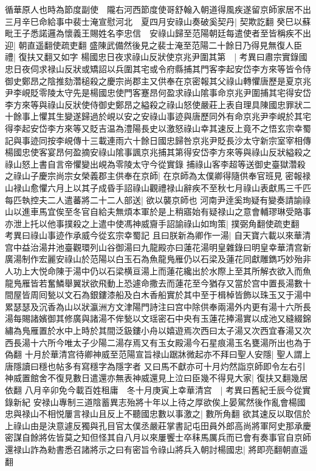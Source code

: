 循華原人也時為節度副使　隴右河西節度使哥舒翰入朝道得風疾遂留京師家居不出　三月辛巳命給事中裴士淹宣慰河北　夏四月安祿山奏破奚契丹|{
	契欺訖翻}
癸巳以蘇毗王子悉諾邏為懷義王賜姓名李忠信　安祿山歸至范陽朝廷每遣使者至皆稱疾不出迎|{
	朝直遥翻使疏吏翻}
盛陳武備然後見之裴士淹至范陽二十餘日乃得見無復人臣禮|{
	復扶又翻又如字}
楊國忠日夜求祿山反狀使京兆尹圍其第　|{
	考異曰肅宗實錄國忠日夜伺求禄山反狀或矯詔以兵圍其宅或令府縣捕其門客李起安岱李方來等皆令侍御史鄭昂之陰推劾濳槌殺之慶宗尚郡主又供奉在京密報其父祿山轉懼唐歷是夏京兆尹李峴貶零陵太守先是楊國忠使門客蹇昂何盈求祿山隂事命京兆尹圍捕其宅得安岱李方來等與祿山反狀使侍御史鄭昂之縊殺之祿山怒使嚴莊上表自理具陳國忠罪狀二十餘事上懼其生變遂歸過於峴以安之安祿山事迹與唐歷同外有命京兆尹李峴於其宅得李起安岱李方來等又貶吉温為澧陽長史以激怒祿山幸其速反上竟不之悟玄宗幸蜀記與事迹同按李峴傳十三載連雨六十餘日國忠歸咎京兆尹貶長沙太守新宗室宰相傳楊國忠使客宴昂何盈摘安祿山隂事諷京兆捕其第得安岱李方來等與祿山反狀縊殺之祿山怒上書自言帝懼變出峴為零陵太守今從實錄}
捕祿山客李超等送御史臺獄濳殺之祿山子慶宗尚宗女榮義郡主供奉在京師|{
	在京師為太僕卿得隨供奉官班見}
密報禄山禄山愈懼六月上以其子成昏手詔祿山觀禮禄山辭疾不至秋七月祿山表獻馬三千匹每匹執控夫二人遣蕃將二十二人部送|{
	欲以襲京師也}
河南尹逹奚珣疑有變奏請諭祿山以進車馬宜俟至冬官自給夫無煩本軍於是上稍寤始有疑禄山之意會輔璆琳受賂事亦泄上托以他事撲殺之上遣中使馮神威齎手詔諭祿山如珣策|{
	撲弼角翻使疏吏翻　考異曰祿山事迹作承威今從玄宗幸蜀記}
且曰朕新為卿作一湯|{
	自天寶六載以來華清宫中益治湯井池臺觀環列山谷御湯曰九龍殿亦曰蓮花湯明皇雜錄曰明皇幸華清宫新廣湯制作宏麗安祿山於范陽以白玉石為魚龍鳬雁仍以石梁及蓮花同獻雕鐫巧妙殆非人功上大悦命陳于湯中仍以石梁横亘湯上而蓮花纔出於水際上至其所解衣欲入而魚龍鳬雁皆若奮鱗舉翼狀欲飛動上恐遽命撒去而蓮花至今猶存又當於宫中置長湯數十間屋皆周囘甃以文石為銀鏤漆船及白木香船實於其中至于楫棹皆飾以珠玉又于湯中累瑟瑟及沉香為山以狀瀛洲方文津陽門詩注曰宫中除供奉兩湯外内更有湯十六所長湯每賜諸嬪御其修廣與諸湯不侔甃以文瑶密石中央有玉蓮花捧湯實以成池又縫綴錦繡為鳬雁置於水中上時於其間泛鈒鏤小舟以嬉遊焉次西曰太子湯又次西宜春湯又次西長湯十六所今唯太子少陽二湯存焉又有玉女殿湯今石星痕湯玉名甕湯所出也為于偽翻}
十月於華清宫待卿神威至范陽宣旨禄山踞牀微起亦不拜曰聖人安隱|{
	聖人謂上唐隱讀曰穩也帖多有寫穩字為隱字者}
又曰馬不獻亦可十月灼然詣京師即令左右引神威置館舍不復見數日遣還亦無表神威還見上泣曰臣幾不得見大家|{
	復扶又翻幾居依翻}
八月辛卯免今載百姓租庸　冬十月庚寅上幸華清宫　|{
	考異曰舊紀壬辰今從實錄新紀}
安禄山專制三道陰蓄異志殆將十年以上待之厚欲俟上晏駕然後作亂會楊國忠與禄山不相悦屢言禄山且反上不聽國忠數以事激之|{
	數所角翻}
欲其速反以取信於上祿山由是決意遽反獨與孔目官太僕丞嚴莊掌書記屯田員外郎高尚將軍阿史那承慶密謀自餘將佐皆莫之知但怪其自八月以來屢饗士卒秣馬厲兵而已會有奏事官自京師還禄山詐為勑書悉召諸將示之曰有密旨令祿山將兵入朝討楊國忠|{
	將即亮翻朝直遥翻}
